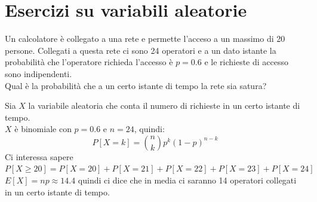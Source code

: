 \documentclass[12pt]{report}
\newcounter{exercise}
\begin{document}
  	\section{Esercizi su variabili aleatorie}
  	\begin{exercise}{}{}
  		\begin{assignment}{}{}
  			Un calcolatore è collegato a una rete e permette l'acceso a un massimo di 20 persone. Collegati a questa rete ci sono 24 operatori e a un dato istante la probabilità che l'operatore richieda l'accesso è $p = 0.6$ e le richieste di accesso sono indipendenti. \\
  			Qual è la probabilità che a un certo istante di tempo la rete sia satura?
  		\end{assignment}
  		Sia $X$ la variabile aleatoria che conta il numero di richieste in un certo istante di tempo. \\
  		$X$ è binomiale con $p = 0.6$ e $n = 24$, quindi:
  		\[
  		P[X = k] = \binom{n}{k}p^k(1-p)^{n-k}
  		\]
  		Ci interessa sapere $P[X \geq 20] = P[X = 20] + P[X = 21] + P[X = 22] + P[X = 23] + P[X = 24]$ \\
  		$E[X] = np \approx 14.4$ quindi ci dice che in media ci saranno 14 operatori collegati in un certo istante di tempo.
  	\end{exercise}
\end{document}
